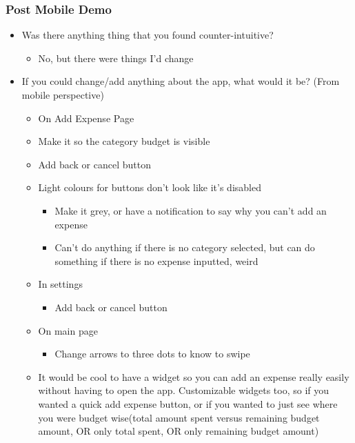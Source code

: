 \documentclass{chi2011}
\begin{document}
	\subsubsection{Post Mobile Demo}
	\begin{itemize}[noitemsep]
		\item Was there anything thing that you found counter-intuitive?
		\begin{itemize}[noitemsep]
			\item No, but there were things I'd change
		\end{itemize}
		\item If you could change/add anything about the app, what would it be? (From mobile perspective)
		\begin{itemize}[noitemsep]
			\item On Add Expense Page
			\item Make it so the category budget is visible
			\item Add back or cancel button
			\item Light colours for buttons don't look like it's disabled
			\begin{itemize}[noitemsep]
				\item Make it grey, or have a notification to say why you can't add an expense
				\item Can't do anything if there is no category selected, but can do something if there
				  is no expense inputted, weird
			\end{itemize}
			\item In settings 
			\begin{itemize}[noitemsep]
				\item Add back or cancel button
			\end{itemize}
			\item On main page
			\begin{itemize}[noitemsep]
				\item Change arrows to three dots to know to swipe
			\end{itemize}
			\item 
				It would be cool to have a widget so you can add an expense really easily without having 
				to open the app. Customizable widgets too, so if you wanted a quick add expense button, 
				or if you wanted to just see where you were budget wise(total amount spent versus 
				remaining budget amount, OR only total spent, OR only remaining budget amount)
		\end{itemize}
	\end{itemize}
\end{document}
